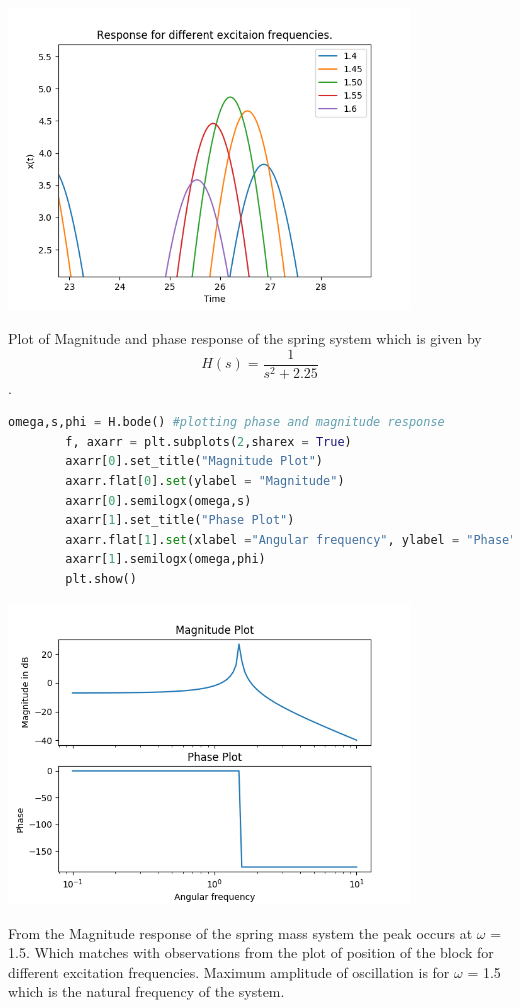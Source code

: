 \documentclass[a4paper]{article}
\begin{document}
\begin{center}
\includegraphics[width=0.8\textwidth]{Figure_3c.png}
\end{center}
Plot of Magnitude and phase response of the spring system which is given by
$$ H(s) = \frac{1}{s^{2} + 2.25}$$.
\begin{lstlisting}[language=Python]
omega,s,phi = H.bode() #plotting phase and magnitude response
		f, axarr = plt.subplots(2,sharex = True)
		axarr[0].set_title("Magnitude Plot")
		axarr.flat[0].set(ylabel = "Magnitude")
		axarr[0].semilogx(omega,s)
		axarr[1].set_title("Phase Plot")
		axarr.flat[1].set(xlabel ="Angular frequency", ylabel = "Phase")
		axarr[1].semilogx(omega,phi)
		plt.show()
\end{lstlisting}

\begin{center}
\includegraphics[width=0.8\textwidth]{Figure_3b.png}
\end{center}
From the Magnitude response of the spring mass system the peak occurs at $\omega$ = 1.5. Which matches with observations from the plot of position of the block for different excitation frequencies. Maximum amplitude of oscillation is for $\omega$ = 1.5 which is the natural frequency of the system.
\end{document}
